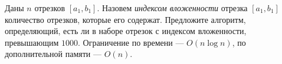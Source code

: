 \documentclass{article}
\begin{document}
Даны $n$ отрезков $[a_1, b_1]$. Назовем \textit{индексом вложенности} отрезка $[a_1,b_1]$ количество отрезков, которые его содержат.
Предложите алгоритм, определяющий, есть ли в наборе отрезок с индексом вложенности, превышающим $1000$. Ограничение по времени --- $O(n \log n)$, по дополнительной памяти --- $O(n)$.
\end{document}

